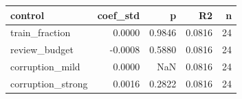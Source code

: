 \begin{tabular}{lrrrr}
\toprule
          control &  coef\_std &      p &     R2 &  n \\
\midrule
   train\_fraction &    0.0000 & 0.9846 & 0.0816 & 24 \\
    review\_budget &   -0.0008 & 0.5880 & 0.0816 & 24 \\
  corruption\_mild &    0.0000 &    NaN & 0.0816 & 24 \\
corruption\_strong &    0.0016 & 0.2822 & 0.0816 & 24 \\
\bottomrule
\end{tabular}
